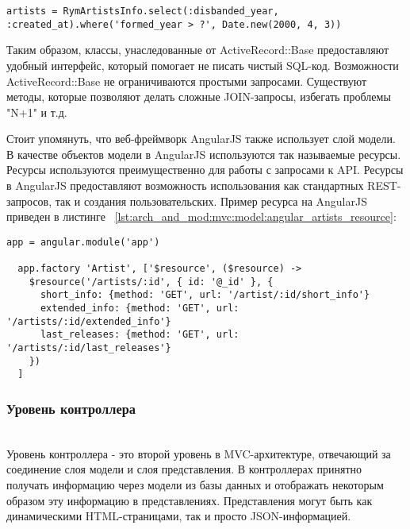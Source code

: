 \begin{lstlisting}[style=fsharpstyle,caption={Пример получения артистов по определённым параметрам}, label=lst:arch_and_mod:mvc:model:select_artist_where_year]
  artists = RymArtistsInfo.select(:disbanded_year, :created_at).where('formed_year > ?', Date.new(2000, 4, 3))
\end{lstlisting}

Таким образом, классы, унаследованные от ActiveRecord::Base предоставляют удобный интерфейс, который помогает не писать чистый SQL-код. Возможности ActiveRecord::Base не ограничиваются простыми запросами. Существуют методы, которые позволяют делать сложные JOIN-запросы, избегать проблемы "N+1" и т.д.

Стоит упомянуть, что веб-фреймворк AngularJS также использует слой модели. В качестве объектов модели в AngularJS используются так называемые ресурсы. Ресурсы используются преимущественно для работы с запросами к API. Ресурсы в AngularJS предоставляют возможность использования как стандартных REST-запросов, так и создания пользовательских. Пример ресурса на AngularJS приведен в листинге ~\ref{lst:arch_and_mod:mvc:model:angular_artists_resource}:

\begin{lstlisting}[style=fsharpstyle,caption={Пример получения артистов по определённым параметрам}, label=lst:arch_and_mod:mvc:model:angular_artists_resource]
  app = angular.module('app')

  app.factory 'Artist', ['$resource', ($resource) ->
    $resource('/artists/:id', { id: '@_id' }, {
      short_info: {method: 'GET', url: '/artist/:id/short_info'}
      extended_info: {method: 'GET', url: '/artists/:id/extended_info'}
      last_releases: {method: 'GET', url: '/artists/:id/last_releases'}
    })
  ]
\end{lstlisting}

\subsubsection{Уровень контроллера}
\label{sub:arch_and_mod:mvc:controller}
~\\

Уровень контроллера - это второй уровень в MVC-архитектуре, отвечающий за соединение слоя модели и слоя представления. В контроллерах принятно получать информацию через модели из базы данных и отображать некоторым образом эту информацию в представлениях. Представления могут быть как динамическими HTML-страницами, так и просто JSON-информацией.


